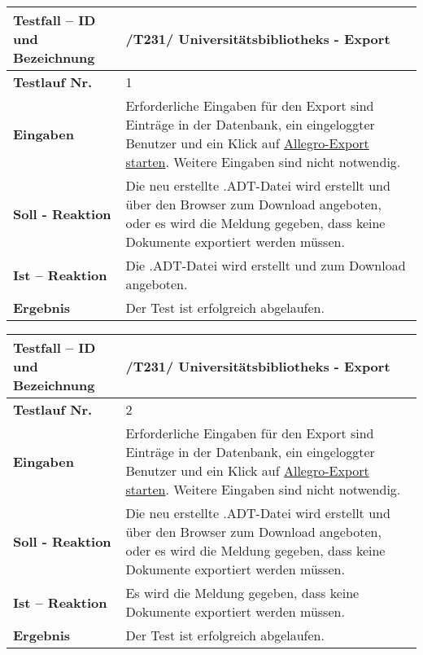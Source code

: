 \begin{longtable}{|p{5cm}|p{10cm}|}
\hline
\textbf{Testfall -- ID und Bezeichnung} &
\textnormal{/T231/ Universitätsbibliotheks - Export} \\
\hline 
\textbf{Testlauf Nr.} & \textnormal{1} \\
\hline
\textbf{Eingaben} & \textnormal{Erforderliche Eingaben für den Export sind Einträge in der
Datenbank, ein eingeloggter Benutzer und ein Klick auf \uline{Allegro-Export
starten}. Weitere Eingaben sind nicht notwendig. } \\
\hline
\textbf{Soll - Reaktion} & \textnormal{Die neu erstellte .ADT-Datei wird erstellt
und über den Browser zum Download angeboten, oder es wird die Meldung gegeben,
dass keine Dokumente exportiert werden müssen. } \\
\hline
\textbf{Ist -- Reaktion} & \textnormal{Die .ADT-Datei wird erstellt und zum
Download angeboten. } \\
\hline
\textbf{Ergebnis} & \textnormal{Der Test ist erfolgreich abgelaufen. } \\
\hline
\end{longtable}

\begin{longtable}{|p{5cm}|p{10cm}|}
\hline
\textbf{Testfall -- ID und Bezeichnung} &
\textnormal{/T231/ Universitätsbibliotheks - Export} \\
\hline 
\textbf{Testlauf Nr.} & \textnormal{2} \\
\hline
\textbf{Eingaben} & \textnormal{Erforderliche Eingaben für den Export sind Einträge in der
Datenbank, ein eingeloggter Benutzer und ein Klick auf \uline{Allegro-Export
starten}. Weitere Eingaben sind nicht notwendig. } \\
\hline
\textbf{Soll - Reaktion} & \textnormal{Die neu erstellte .ADT-Datei wird erstellt
und über den Browser zum Download angeboten, oder es wird die Meldung gegeben,
dass keine Dokumente exportiert werden müssen. } \\
\hline
\textbf{Ist -- Reaktion} & \textnormal{Es wird die Meldung gegeben, dass keine
Dokumente exportiert werden müssen. } \\
\hline
\textbf{Ergebnis} & \textnormal{Der Test ist erfolgreich abgelaufen. } \\
\hline
\end{longtable}
